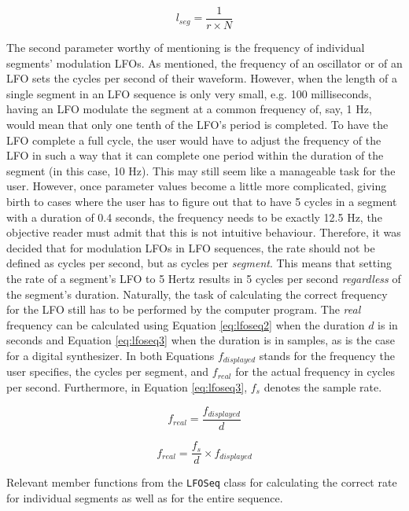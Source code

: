 \documentclass[12pt,twoside]{report}
\begin{document}
\begin{equation}
  l_{seg} = \frac{1}{r \times N}
  \label{eq:lfoseq1}
\end{equation}

\noindent The second parameter worthy of mentioning is the frequency of individual segments' modulation LFOs. As mentioned, the frequency of an oscillator or of an LFO sets the cycles per second of their waveform. However, when the length of a single segment in an LFO sequence is only very small, e.g. 100 milliseconds, having an LFO modulate the segment at a common frequency of, say, 1 Hz, would mean that only one tenth of the LFO's period is completed. To have the LFO complete a full cycle, the user would have to adjust the frequency of the LFO in such a way that it can complete one period within the duration of the segment (in this case, 10 Hz). This may still seem like a manageable task for the user. However, once parameter values become a little more complicated, giving birth to cases where the user has to figure out that to have 5 cycles in a segment with a duration of 0.4 seconds, the frequency needs to be exactly 12.5 Hz, the objective reader must admit that this is not intuitive behaviour. Therefore, it was decided that for modulation LFOs in LFO sequences, the rate should not be defined as cycles per second, but as cycles per \emph{segment}. This means that setting the rate of a segment's LFO to 5 Hertz results in 5 cycles per second \emph{regardless} of the segment's duration. Naturally, the task of calculating the correct frequency for the LFO still has to be performed by the computer program. The \emph{real} frequency can be calculated using Equation \ref{eq:lfoseq2} when the duration $d$ is in seconds and Equation \ref{eq:lfoseq3} when the duration is in samples, as is the case for a digital synthesizer. In both Equations $f_{displayed}$ stands for the frequency the user specifies, the cycles per segment, and $f_{real}$ for the actual frequency in cycles per second. Furthermore, in Equation \ref{eq:lfoseq3}, $f_{s}$ denotes the sample rate.

\begin{equation}
  f_{real} = \frac{f_{displayed}}{d}
  \label{eq:lfoseq2}
\end{equation}

\begin{equation}
  f_{real} = \frac{f_{s}}{d} \times f_{displayed}
  \label{eq:lfoseq3}
\end{equation}

\begin{table}[t!]
  \caption{Relevant member functions from the \texttt{LFOSeq} class for calculating the correct rate for individual segments as well as for the entire sequence.}
  \label{code:lfoseq}
\end{table}
\end{document}
